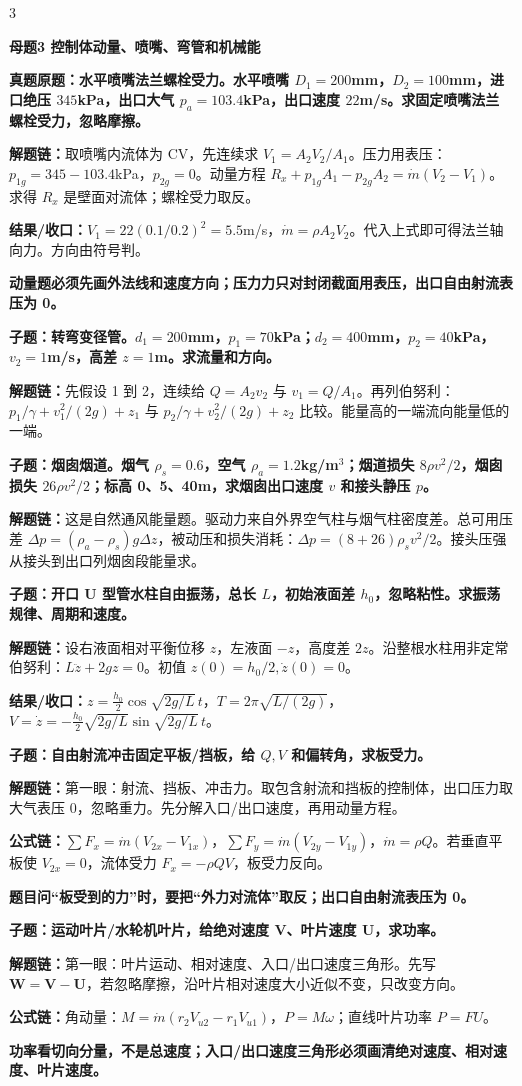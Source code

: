 \documentclass[a4paper]{article}
\newcommand{\mt}[1]{\vspace{0.45pt}\colorbox{M}{\parbox{\dimexpr\linewidth-2\fboxsep}{\color{white}\bfseries #1}}\par}
\newcommand{\qt}[1]{\vspace{0.25pt}\colorbox{Q}{\parbox{\dimexpr\linewidth-2\fboxsep}{\color{white}\bfseries #1}}\par}
\newcommand{\warn}[1]{\colorbox{Y}{\parbox{\dimexpr\linewidth-2\fboxsep}{\color{E}\bfseries #1}}\par}
\newcommand{\chain}[1]{{\color{A}\bfseries 解题链：}#1\par}
\newcommand{\res}[1]{{\color{E}\bfseries 结果/收口：}#1\par}
\newcommand{\form}[1]{{\color{M}\bfseries 公式链：}#1\par}
\begin{document}
\begin{multicols}{3}
\mt{母题3 控制体动量、喷嘴、弯管和机械能}
\qt{真题原题：水平喷嘴法兰螺栓受力。水平喷嘴 $D_1=200$mm，$D_2=100$mm，进口绝压 $345$kPa，出口大气 $p_a=103.4$kPa，出口速度 $22$m/s。求固定喷嘴法兰螺栓受力，忽略摩擦。}
\chain{取喷嘴内流体为 CV，先连续求 $V_1=A_2V_2/A_1$。压力用表压：$p_{1g}=345-103.4$kPa，$p_{2g}=0$。动量方程 $R_x+p_{1g}A_1-p_{2g}A_2=\dot m(V_2-V_1)$。求得 $R_x$ 是壁面对流体；螺栓受力取反。}
\res{$V_1=22(0.1/0.2)^2=5.5$m/s，$\dot m=\rho A_2V_2$。代入上式即可得法兰轴向力。方向由符号判。}
\warn{动量题必须先画外法线和速度方向；压力力只对封闭截面用表压，出口自由射流表压为 0。}

\qt{子题：转弯变径管。$d_1=200$mm，$p_1=70$kPa；$d_2=400$mm，$p_2=40$kPa，$v_2=1$m/s，高差 $z=1$m。求流量和方向。}
\chain{先假设 1 到 2，连续给 $Q=A_2v_2$ 与 $v_1=Q/A_1$。再列伯努利：$p_1/\gamma+v_1^2/(2g)+z_1$ 与 $p_2/\gamma+v_2^2/(2g)+z_2$ 比较。能量高的一端流向能量低的一端。}

\qt{子题：烟囱烟道。烟气 $\rho_s=0.6$，空气 $\rho_a=1.2$kg/m$^3$；烟道损失 $8\rho v^2/2$，烟囱损失 $26\rho v^2/2$；标高 0、5、40m，求烟囱出口速度 $v$ 和接头静压 $p$。}
\chain{这是自然通风能量题。驱动力来自外界空气柱与烟气柱密度差。总可用压差 $\Delta p=(\rho_a-\rho_s)g\Delta z$，被动压和损失消耗：$\Delta p=(8+26)\rho_s v^2/2$。接头压强从接头到出口列烟囱段能量求。}

\qt{子题：开口 U 型管水柱自由振荡，总长 $L$，初始液面差 $h_0$，忽略粘性。求振荡规律、周期和速度。}
\chain{设右液面相对平衡位移 $z$，左液面 $-z$，高度差 $2z$。沿整根水柱用非定常伯努利：$L\ddot z+2gz=0$。初值 $z(0)=h_0/2,\dot z(0)=0$。}
\res{$z=\frac{h_0}{2}\cos\sqrt{2g/L}\,t$，$T=2\pi\sqrt{L/(2g)}$，$V=\dot z=-\frac{h_0}{2}\sqrt{2g/L}\sin\sqrt{2g/L}\,t$。}

\qt{子题：自由射流冲击固定平板/挡板，给 $Q,V$ 和偏转角，求板受力。}
\chain{第一眼：射流、挡板、冲击力。取包含射流和挡板的控制体，出口压力取大气表压 0，忽略重力。先分解入口/出口速度，再用动量方程。}
\form{$\sum F_x=\dot m(V_{2x}-V_{1x})$，$\sum F_y=\dot m(V_{2y}-V_{1y})$，$\dot m=\rho Q$。若垂直平板使 $V_{2x}=0$，流体受力 $F_x=-\rho QV$，板受力反向。}
\warn{题目问“板受到的力”时，要把“外力对流体”取反；出口自由射流表压为 0。}

\qt{子题：运动叶片/水轮机叶片，给绝对速度 $\bm V$、叶片速度 $\bm U$，求功率。}
\chain{第一眼：叶片运动、相对速度、入口/出口速度三角形。先写 $\bm W=\bm V-\bm U$，若忽略摩擦，沿叶片相对速度大小近似不变，只改变方向。}
\form{角动量：$M=\dot m(r_2V_{u2}-r_1V_{u1})$，$P=M\omega$；直线叶片功率 $P=FU$。}
\warn{功率看切向分量，不是总速度；入口/出口速度三角形必须画清绝对速度、相对速度、叶片速度。}


\end{multicols}
\end{document}
